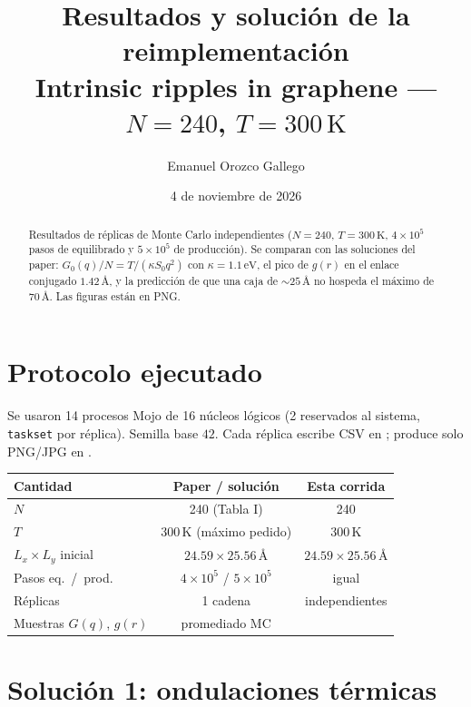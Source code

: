 \documentclass[11pt,a4paper]{article}
\title{Resultados y solución de la reimplementación\\[0.35em]
\large Intrinsic ripples in graphene --- $N=240$, $T=300\,\mathrm{K}$}
\author{Emanuel Orozco Gallego}
\date{4 de noviembre de 2026}
\begin{document}
\maketitle

\begin{abstract}
Resultados de \Nrep{} réplicas de Monte Carlo independientes ($N=240$, $T=300\,\mathrm{K}$, $4\times 10^5$ pasos de equilibrado y $5\times 10^5$ de producción). Se comparan con las soluciones del paper: $G_0(q)/N=T/(\kappa S_0 q^2)$ con $\kappa=1.1\,\mathrm{eV}$, el pico de $g(r)$ en el enlace conjugado $1.42\,\text{\AA}$, y la predicción de que una caja de $\sim 25\,\text{\AA}$ no hospeda el máximo de $70\,\text{\AA}$. Las figuras están en PNG.
\end{abstract}

\tableofcontents
\vspace{0.5em}

\section{Protocolo ejecutado}

Se usaron 14 procesos Mojo de 16 núcleos lógicos (2 reservados al sistema, \texttt{taskset} por réplica). Semilla base $42$. Cada réplica escribe CSV en ;  produce solo PNG/JPG en .

\begin{center}
\small
\begin{tabular}{lcc}
\toprule
Cantidad & Paper / solución & Esta corrida \\
\midrule
$N$ & 240 (Tabla I) & 240 \\
$T$ & $300\,\mathrm{K}$ (máximo pedido) & $300\,\mathrm{K}$ \\
$L_x\times L_y$ inicial & $24.59\times 25.56\,\text{\AA}$ & $24.59\times 25.56\,\text{\AA}$ \\
Pasos eq.\ /\ prod. & $4\times 10^5$ / $5\times 10^5$ & igual \\
Réplicas & 1 cadena & \Nrep{} independientes \\
Muestras $G(q)$, $g(r)$ & promediado MC & \NsampTot{} \\
\bottomrule
\end{tabular}
\end{center}

\section{Solución 1: ondulaciones térmicas}
\end{document}

